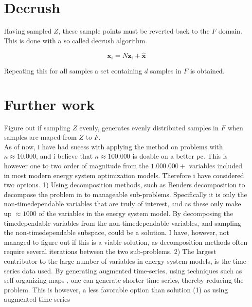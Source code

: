\documentclass[11pt,a4paper,english]{article}
\begin{document}
\section{Decrush}

Having sampled $Z$, these sample points must be reverted back to the $F$ domain. This is done with a so called decrush algorithm. 

\begin{equation}
	\mathbf{x}_i = N \mathbf{z}_i + \mathbf{\hat{x}}
\end{equation}

Repeating this for all samples a set containing $d$ samples in $F$ is obtained. 

\section{Further work}

Figure out if sampling $Z$ evenly, generates evenly distributed samples in $F$ when samples are maped from $Z$ to $F$. \\

As of now, i have had sucess with applying the method on problems with $n\approx 10.000$, and i believe that $n\approx 100.000$ is doable on a better pc. This is however one to two order of magnitude from the $1.000.000+$ variables included in most modern energy system optimization models. Therefore i have considered two options. 1) Using decomposition methods, such as Benders decomposition to decompose the problem in to manageable sub-problems. Specifically it is only the non-timedependable variables that are truly of interest, and as these only make up $\approx 1000$ of the variables in the energy system model. By decomposing the timedependable variables from the non-timedependable variables, and sampling the non-timedependable subspace, could be a solution. I have, however, not managed to figure out if this is a viable solution, as decomposition methods often require several iterations between the two sub-problems.  
2) The largest contributor to the large number of variables in energy system models, is the time-series data used. By generating augmented time-series, using techniques such as self organizing maps \cite{Hasan2019}, one can generate shorter time-series, thereby reducing the problem. This is however, a less favorable option than solution (1) as using augmented time-series 

\clearpage
\printbibliography
\end{document}
